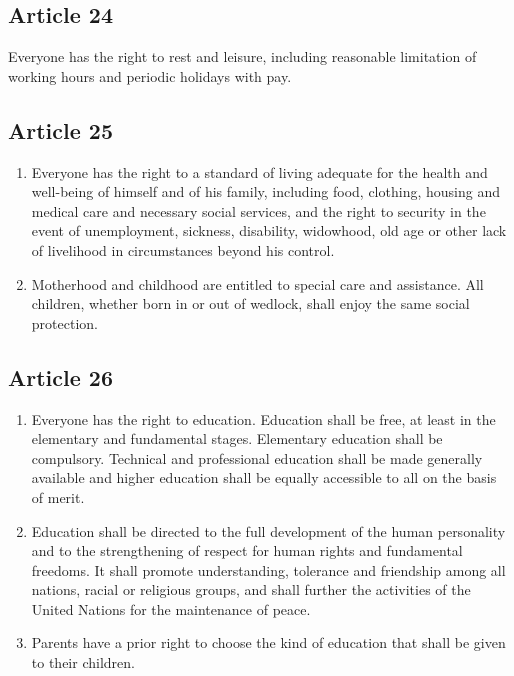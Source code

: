 \documentclass[
  titlepage,
  openright,
  DIV=calc,
  toc=listof,
  listof=nochaptergap]{scrbook}
\begin{document}
\hypertarget{article-24}{%
\subsection{Article 24}\label{article-24}}

Everyone has the right to rest and leisure, including reasonable
limitation of working hours and periodic holidays with pay.

\hypertarget{article-25}{%
\subsection{Article 25}\label{article-25}}

\begin{enumerate}
\def\labelenumi{\arabic{enumi}.}
\item
  Everyone has the right to a standard of living adequate for the health
  and well-being of himself and of his family, including food, clothing,
  housing and medical care and necessary social services, and the right
  to security in the event of unemployment, sickness, disability,
  widowhood, old age or other lack of livelihood in circumstances beyond
  his control.
\item
  Motherhood and childhood are entitled to special care and assistance.
  All children, whether born in or out of wedlock, shall enjoy the same
  social protection.
\end{enumerate}

\hypertarget{article-26}{%
\subsection{Article 26}\label{article-26}}

\begin{enumerate}
\def\labelenumi{\arabic{enumi}.}
\item
  Everyone has the right to education. Education shall be free, at least
  in the elementary and fundamental stages. Elementary education shall
  be compulsory. Technical and professional education shall be made
  generally available and higher education shall be equally accessible
  to all on the basis of merit.
\item
  Education shall be directed to the full development of the human
  personality and to the strengthening of respect for human rights and
  fundamental freedoms. It shall promote understanding, tolerance and
  friendship among all nations, racial or religious groups, and shall
  further the activities of the United Nations for the maintenance of
  peace.
\item
  Parents have a prior right to choose the kind of education that shall
  be given to their children.
\end{enumerate}
\end{document}
